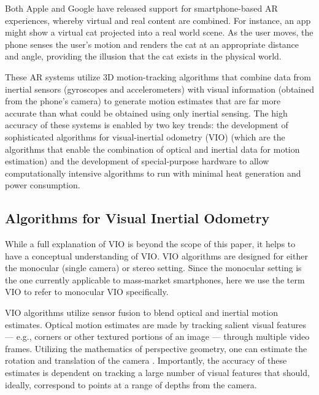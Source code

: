 \documentclass[chi_draft]{sigchi}
\newcommand{\BVI}{B/VI\xspace}
\newcommand{\OM}{O\&M\xspace}
\begin{document}
Both Apple and Google have released support for smartphone-based AR experiences, whereby virtual and real content are combined.  For instance, an app might show a virtual cat projected into a real world scene.  As the user moves, the phone senses the user's motion and renders the cat at an appropriate distance and angle, providing the illusion that the cat exists in the physical world.

These AR systems utilize 3D motion-tracking algorithms that combine data from inertial sensors (gyroscopes and accelerometers) with visual information (obtained from the phone's camera) to generate motion estimates that are far more accurate than what could be obtained using only inertial sensing.  The high accuracy of these systems is enabled by two key trends: the development of sophisticated algorithms for visual-inertial odometry (VIO) \cite{li2013high,leutenegger2015keyframe,bloesch2015robust,forster2014svo} (which are the algorithms that enable the combination of optical and inertial data for motion estimation) and the development of special-purpose hardware to allow computationally intensive algorithms to run with minimal heat generation and power consumption.%

\subsection{Algorithms for Visual Inertial Odometry}
While a full explanation of VIO \cite{gui2015review} is beyond the scope of this paper, it helps to have a conceptual understanding of VIO.  VIO algorithms are designed for either the monocular (single camera) or stereo setting.  Since the monocular setting is the one currently applicable to mass-market smartphones, here we use the term VIO to refer to monocular VIO specifically.

VIO algorithms utilize sensor fusion to blend optical and inertial motion estimates.  Optical motion estimates are made by tracking salient visual features --- e.g., corners or other textured portions of an image --- through multiple video frames.  Utilizing the mathematics of perspective geometry, one can estimate the rotation and translation of the camera \cite{Hartley2004}.  Importantly, the accuracy of these estimates is dependent on tracking a large number of visual features that should, ideally, correspond to points at a range of depths from the camera.%
\end{document}

